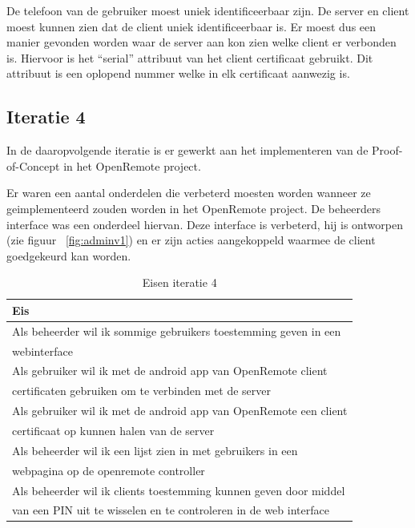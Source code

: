 \documentclass[]{article}
\begin{document}
De telefoon van de gebruiker moest uniek identificeerbaar zijn. De server
en client moest kunnen zien dat de client uniek identificeerbaar is. Er
moest dus een manier gevonden worden waar de server aan kon zien welke
client er verbonden is. Hiervoor is het ``serial'' attribuut van het client
certificaat gebruikt. Dit attribuut is een oplopend nummer welke in elk
certificaat aanwezig is.

\subsection{Iteratie 4}
In de daaropvolgende iteratie is er gewerkt aan het implementeren van de
Proof-of-Concept in het OpenRemote project.

Er waren een aantal onderdelen die verbeterd moesten worden wanneer ze
geimplementeerd zouden worden in het OpenRemote project. De beheerders
interface was een onderdeel hiervan. Deze interface is verbeterd, hij is
ontworpen (zie figuur ~\ref{fig:adminv1}) en er zijn acties aangekoppeld waarmee de client
goedgekeurd kan worden.

\begin{table}[htpb]
  \caption{Eisen iteratie 4}
  \begin{center}
    \begin{tabular}{|| l ||}\hline
        Eis                                                              \\\hline\hline
        Als beheerder wil ik sommige gebruikers toestemming geven in een \\ 
        webinterface                                                     \\\hline
        Als gebruiker wil ik met de android app van OpenRemote client    \\ 
        certificaten gebruiken om te verbinden met de server             \\\hline
        Als gebruiker wil ik met de android app van OpenRemote een client\\
        certificaat op kunnen halen van de server                        \\\hline
        Als beheerder wil ik een lijst zien in met gebruikers in een     \\ 
        webpagina op de openremote controller                            \\\hline
        Als beheerder wil ik clients toestemming kunnen geven door middel\\ 
        van een PIN uit te wisselen en te controleren in de web interface\\\hline
    \end{tabular}
  \end{center}
\end{table}
\end{document}
